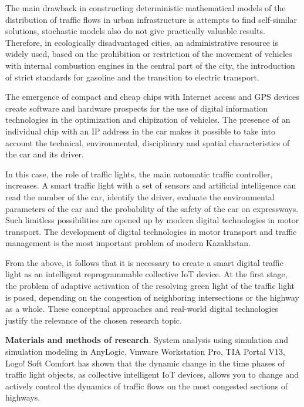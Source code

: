 \begin{multicols}{2}
The main drawback in constructing deterministic mathematical models of
the distribution of traffic flows in urban infrastructure is attempts to
find self-similar solutions, stochastic models also do not give
practically valuable results. Therefore, in ecologically disadvantaged
cities, an administrative resource is widely used, based on the
prohibition or restriction of the movement of vehicles with internal
combustion engines in the central part of the city, the introduction of
strict standards for gasoline and the transition to electric transport.

The emergence of compact and cheap chips with Internet access and GPS
devices create software and hardware prospects for the use of digital
information technologies in the optimization and chipization of
vehicles. The presence of an individual chip with an IP address in the
car makes it possible to take into account the technical, environmental,
disciplinary and spatial characteristics of the car and its driver.

In this case, the role of traffic lights, the main automatic traffic
controller, increases. A smart traffic light with a set of sensors and
artificial intelligence can read the number of the car, identify the
driver, evaluate the environmental parameters of the car and the
probability of the safety of the car on expressways. Such limitless
possibilities are opened up by modern digital technologies in motor
transport. The development of digital technologies in motor transport
and traffic management is the most important problem of modern
Kazakhstan.

From the above, it follows that it is necessary to create a smart
digital traffic light as an intelligent reprogrammable collective IoT
device. At the first stage, the problem of adaptive activation of the
resolving green light of the traffic light is posed, depending on the
congestion of neighboring intersections or the highway as a whole. These
conceptual approaches and real-world digital technologies justify the
relevance of the chosen research topic.

{\bfseries Materials and methods of research}\emph{.} System analysis using
simulation and simulation modeling in AnyLogic, Vmware Workstation Pro,
TIA Portal V13, Logo! Soft Comfort has shown that the dynamic change in
the time phases of traffic light objects, as collective intelligent IoT
devices, allows you to change and actively control the dynamics of
traffic flows on the most congested sections of highways.


\end{multicols}

